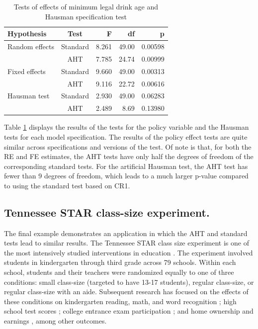 \documentclass[draft]{ectaart}\usepackage[]{graphicx}\usepackage[]{color}
\begin{document}
\begin{table}[bth]
\centering
\caption{Tests of effects of minimum legal drink age and Hausman specification test} 
\label{tab:MLDA}
\begin{tabular}{lcrrr}
  \toprule
Hypothesis & Test & F & df & p \\ 
  \midrule
Random effects & Standard & 8.261 & 49.00 & 0.00598 \\ 
   & AHT & 7.785 & 24.74 & 0.00999 \\ 
  Fixed effects & Standard & 9.660 & 49.00 & 0.00313 \\ 
   & AHT & 9.116 & 22.72 & 0.00616 \\ 
   \midrule
Hausman test & Standard & 2.930 & 49.00 & 0.06283 \\ 
   & AHT & 2.489 & 8.69 & 0.13980 \\ 
   \bottomrule
\end{tabular}
\end{table}


Table \ref{tab:MLDA} displays the results of the tests for the policy variable and the Hausman tests for each model specification. 
The results of the policy effect tests are quite similar across specifications and versions of the test. 
Of note is that, for both the RE and FE estimates, the AHT tests have only half the degrees of freedom of the corresponding standard tests. 
For the artificial Hausman test, the AHT test has fewer than 9 degrees of freedom, which leads to a much larger p-value compared to using the standard test based on CR1. 

\subsection{Tennessee STAR class-size experiment.} 

The final example demonstrates an application in which the AHT and standard tests lead to similar results. The Tennessee STAR class size experiment is one of the most intensively studied interventions in education \citep[for a detailed review, see][]{Schanzenbach2006what}.  The experiment involved students in kindergarten through third grade across 79 schools. Within each school, students and their teachers were randomized equally to one of three conditions: small class-size (targeted to have 13-17 students), regular class-size, or regular class-size with an aide.
Subsequent research has focused on the effects of these conditions on kindergarten reading, math, and word recognition \citep{Achilles2008tennessee}; high school test scores \citep{Schanzenbach2006what}; college entrance exam participation \citep{Krueger2001effect}; and home ownership and earnings \citep{Chetty2011how}, among other outcomes.
\end{document}
